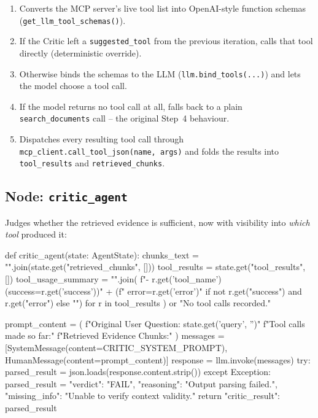 \documentclass[11pt,a4paper]{article}
\begin{document}
\begin{enumerate}
\item Converts the MCP server's live tool list into OpenAI-style function
      schemas (\texttt{get\_llm\_tool\_schemas()}).
\item If the Critic left a \texttt{suggested\_tool} from the previous
      iteration, calls that tool directly (deterministic override).
\item Otherwise binds the schemas to the LLM (\texttt{llm.bind\_tools(...)})
      and lets the model choose a tool call.
\item If the model returns no tool call at all, falls back to a plain
      \texttt{search\_documents} call -- the original Step~4 behaviour.
\item Dispatches every resulting tool call through
      \texttt{mcp\_client.call\_tool\_json(name, args)} and folds the
      results into \texttt{tool\_results} and \texttt{retrieved\_chunks}.
\end{enumerate}

\subsection{Node: \texttt{critic\_agent}}
Judges whether the retrieved evidence is sufficient, now with visibility
into \emph{which tool} produced it:

\begin{pycode}
def critic_agent(state: AgentState):
    chunks_text = "\n\n".join(state.get("retrieved_chunks", []))
    tool_results = state.get("tool_results", [])
    tool_usage_summary = "\n".join(
        f"- {r.get('tool_name')} (success={r.get('success')})"
        + (f" error={r.get('error')}" if not r.get("success") and r.get("error") else "")
        for r in tool_results
    ) or "No tool calls recorded."

    prompt_content = (
        f"Original User Question: {state.get('query', '')}\n\n"
        f"Tool calls made so far:\n\n"
        f"Retrieved Evidence Chunks:"
    )
    messages = [SystemMessage(content=CRITIC_SYSTEM_PROMPT), HumanMessage(content=prompt_content)]
    response = llm.invoke(messages)
    try:
        parsed_result = json.loads(response.content.strip())
    except Exception:
        parsed_result = {"verdict": "FAIL", "reasoning": "Output parsing failed.",
                          "missing_info": "Unable to verify context validity."}
    return {"critic_result": parsed_result}
\end{pycode}
\end{document}

